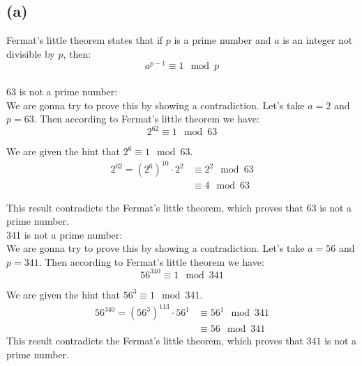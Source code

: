 \documentclass{article}
\begin{document}
\subsection*{(a)}


Fermat's little theorem states that if \(p\) is a prime number and \(a\) is an integer not divisible by \(p\), then:
\[
   a^{p-1} \equiv 1 \mod p
\]
\\
63 is not a prime number: \\
We are gonna try to prove this by showing a contradiction. Let's take \(a = 2\) and \(p = 63\).
Then according to Fermat's little theorem we have:
\[
   2^{62} \equiv 1 \mod 63
\]

We are given the hint that \(2^6 \equiv 1 \mod 63\).
\begin{align*}
   2^{62} = (2^6)^{10} \cdot 2^2 &\equiv 2^2 \mod 63 \\
                                 &\equiv 4 \mod 63
\end{align*}

This result contradicts the Fermat's little theorem, which proves that \(63\) is not a prime number.
\\
341 is not a prime number: \\
We are gonna try to prove this by showing a contradiction. Let's take \(a = 56\) and \(p = 341\).
Then according to Fermat's little theorem we have:
\[
   56^{340} \equiv 1 \mod 341
\]

We are given the hint that \(56^3 \equiv 1 \mod 341\).
\begin{align*}
   56^{340} = (56^3)^{113} \cdot 56^1 &\equiv 56^1 \mod 341 \\
                                       &\equiv 56 \mod 341
\end{align*}
This result contradicts the Fermat's little theorem, which proves that \(341\) is not a prime number.
\end{document}
